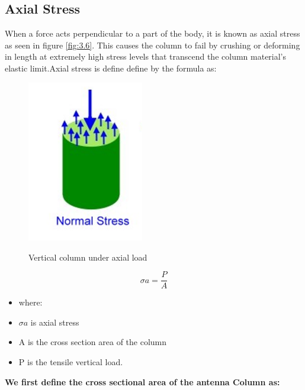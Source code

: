 { 
\subsection{Axial Stress} 
 
  When a force acts perpendicular to a part of the body, it is known as axial stress as seen in figure \ref{fig:3.6}. This causes the column to fail by crushing or deforming in length at extremely high stress levels that transcend the column material's elastic limit.Axial stress is define define by the formula as:
  
  
  \begin{figure}[htp]
    \centering
    \includegraphics[width=2in]{Figures/Direct_shear_stress.png}
    \caption{Vertical column under axial load}
    \cite{amarine_2019}
    \label{fig:3.9}
\end{figure}
  
  
\begin{equation}
 \sigma a = \frac{P}{A}
\end{equation}
    
    \begin{itemize}[label={}]
\item where:
\item \( \sigma a\) is axial stress
\item A is the cross section area of the column
\item P is the tensile vertical load.
    \end{itemize}
    
\textbf{We first define the cross sectional  area  of the antenna Column as:}
    

}
